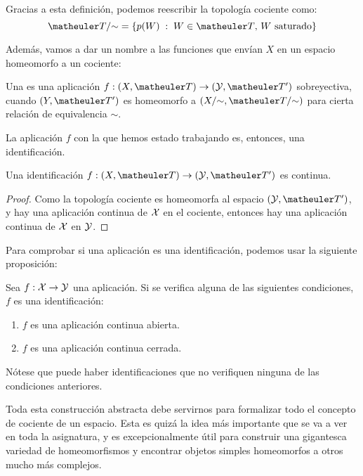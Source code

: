 Gracias a esta definición, podemos reescribir la topología cociente como:
\[\T/\mathord{\sim} = \{p(W)\midc W\in\T\text{, } W\text{ saturado}\}\]

Además, vamos a dar un nombre a las funciones que envían $X$ en un espacio homeomorfo a un cociente:

\begin{defi}[Identificación]
	Una  es una aplicación $f:(X,\T)\to (\mc{Y},\T')$ sobreyectiva, cuando $(Y,\T')$ es homeomorfo a $(X/\mathord{\sim},\T/\mathord{\sim})$ para cierta relación de equivalencia $\mathord{\sim}$.
\end{defi}

La aplicación $f$ con la que hemos estado trabajando es, entonces, una identificación. 

\begin{prop}
	Una identificación $f:(X,\T)\to (\mc{Y},\T')$ es continua.
	
	\begin{proof}
		Como la topología cociente es homeomorfa al espacio $(\mc{Y},\T')$, y hay una aplicación continua de $\mathcal{X}$ en el cociente, entonces hay una aplicación continua de $\mathcal{X}$ en $\mathcal{Y}$.
	\end{proof}
\end{prop}

Para comprobar si una aplicación es una identificación, podemos usar la siguiente proposición:

\begin{prop}
Sea $f:\mathcal{X}\to\mathcal{Y}$ una aplicación. Si se verifica alguna de las siguientes condiciones, $f$ es una identificación:
\begin{enumerate}
\item $f$ es una aplicación continua abierta.
\item $f$ es una aplicación continua cerrada.
\end{enumerate}
\end{prop}

Nótese que puede haber identificaciones que no verifiquen ninguna de las condiciones anteriores.

Toda esta construcción abstracta debe servirnos para formalizar todo el concepto de cociente de un espacio. Esta es quizá la idea más importante que se va a ver en toda la asignatura, y es excepcionalmente útil para construir una gigantesca variedad de homeomorfismos y encontrar objetos simples homeomorfos a otros mucho más complejos.


